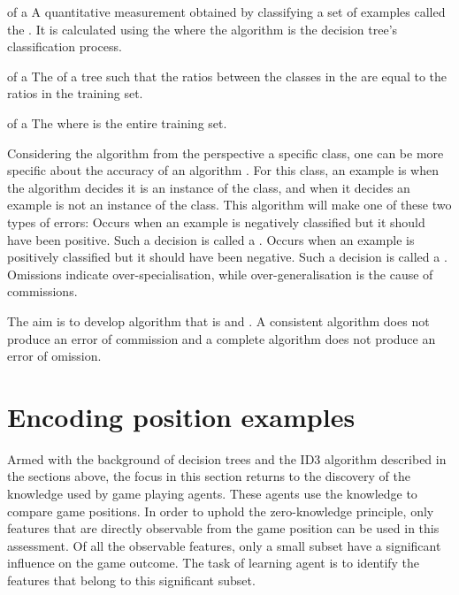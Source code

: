  {of a } {A quantitative measurement obtained by classifying a set of examples called the . It is calculated using the \newline {} where the algorithm is the decision tree's classification process.}  

 {of a }{The  of a tree such that the ratios between the classes in the   are equal to the ratios in the training set. }  

 {of a }{The  where   is the entire training set.}  

Considering the algorithm from the perspective a specific class, one can be more specific about the accuracy of an algorithm \cite{kubat:review}. For this class, an example is  when the algorithm decides it is an instance of the class, and  when it decides an example is not an instance of the class. This algorithm will make one of these two types of errors:
 {Occurs when an example is negatively classified but it should have been positive.  Such a decision is called a .}
 {Occurs when an example is positively classified but it should have been negative.  Such a decision is called a .}
Omissions indicate over-specialisation, while over-generalisation is the cause of commissions. 

The aim is to develop algorithm that is  and . A consistent algorithm does not produce an error of commission and a complete algorithm does not produce an error of omission.   


\section{Encoding position examples}
\label{sec:encoding_examples}
Armed with the background of decision trees and the ID3 algorithm described in the sections above, the focus in this section returns to the discovery of the knowledge used by game playing agents. These agents use the knowledge to compare game positions.  In order to uphold the zero-knowledge principle, only features that are directly observable from the game position can be used in this assessment. Of all the observable features, only a small subset have a significant influence on the game outcome. The task of learning agent is to identify the features that belong to this  significant subset.

